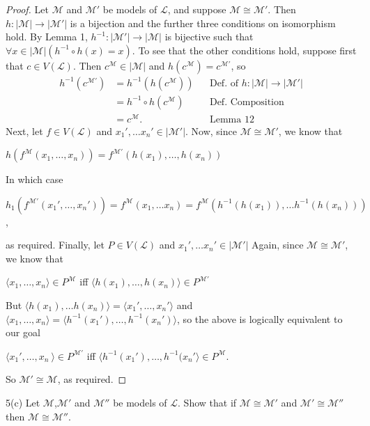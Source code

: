 \documentclass{article}
\begin{document}
\begin{proof}  Let $\mathcal{M}$ and $\mathcal{M'}$  be models of $\mathscr{L}$, and suppose $\mathcal{M} \cong \mathcal{M'}$. Then $h: | \mathcal{M} | \rightarrow | \mathcal{M'} |$
is a bijection and the further three conditions on isomorphism hold. By Lemma 1, $h^{-1}: |\mathcal{M'}| \rightarrow |\mathcal{M}|$ is bijective such that $\forall x\in |\mathcal{M}|(h^{-1} \circ h(x) = x)$. To see that the other conditions hold, suppose first that $c \in V(\mathscr{L})$. Then $c^\mathcal{M} \in |\mathcal{M}|$ and $h(c^\mathcal{M}) = c^\mathcal{M'}$, so
\begin{align*}
h^{-1}(c^\mathcal{M'}) &= h^{-1}(h(c^\mathcal{M}))&&\text{Def. of $h: | \mathcal{M} | \rightarrow | \mathcal{M'} |$}\\
&=h^{-1} \circ h(c^\mathcal{M})&&\text{Def. Composition}\\
&= c^\mathcal{M}.&&\text{Lemma 12}
\end{align*}
Next, let $f \in V(\mathscr{L})$ and $x_1', \ldots x_n' \in |\mathcal{M'}|$. Now, since $\mathcal{M} \cong \mathcal{M'}$, we know that \begin{center} $h(f^\mathcal{M}(x_1,\ldots,x_n)) = f^\mathcal{M'}(h(x_1),\ldots,h(x_n))$ \end{center} In which case \begin{center}$h_1(f^\mathcal{M'}(x_1',\ldots,x_n')) = f^\mathcal{M}(x_1,\ldots x_n) = f^\mathcal{M}(h^{-1}(h(x_1)), \ldots h^{-1}(h(x_n)))$, \end{center} as required. Finally, let $P \in V(\mathscr{L})$ and  $x_1', \ldots x_n' \in |\mathcal{M'}|$ Again, since $\mathcal{M} \cong \mathcal{M'}$, we know that \begin{center} $\langle x_1, \ldots, x_n \rangle \in P^\mathcal{M}$ iff $\langle h(x_1), \ldots, h(x_n) \rangle \in P^\mathcal{M'}$ \end{center} But $\langle h(x_1), \ldots h(x_n) \rangle  = \langle x_1', \ldots, x_n' \rangle$ and $\langle x_1, \ldots, x_n \rangle = \langle h^{-1}(x_1'), \ldots, h^{-1}(x_n') \rangle$, so the above is logically equivalent to our goal \begin{center} $\langle x_1', \ldots, x_n\ \rangle \in P^\mathcal{M'}$ iff  $\langle h^{-1}(x_1'), \ldots, h^{-1}(x_n' \rangle \in P^\mathcal{M}$. \end{center} So $\mathcal{M'} \cong \mathcal{M}$, as required.
\end{proof}
5(c) Let $\mathcal{M}$,$\mathcal{M'}$ and $\mathcal{M''}$ be models of $\mathscr{L}$. Show that if $\mathcal{M} \cong \mathcal{M'}$ and $\mathcal{M'} \cong \mathcal{M''}$then $\mathcal{M} \cong \mathcal{M''}$. 
\end{document}
